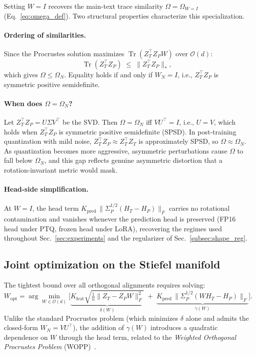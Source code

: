 Setting $W = I$ recovers the main-text trace similarity $\Omega = \Omega_{W=I}$ (Eq.~\ref{eq:omega_def}). Two structural properties characterize this specialization.

\paragraph{Ordering of similarities.}
Since the Procrustes solution maximizes $\operatorname{Tr}(Z_T^\top Z_P W)$ over $\mathcal{O}(d)$:
\begin{equation}
\operatorname{Tr}(Z_T^\top Z_P) \;\le\; \|Z_T^\top Z_P\|_*,
\end{equation}
which gives $\Omega \le \Omega_N$. Equality holds if and only if $W_N = I$, i.e., $Z_T^\top Z_P$ is symmetric positive semidefinite.

\paragraph{When does $\Omega = \Omega_N$?}
Let $Z_T^\top Z_P = U\Sigma V^\top$ be the SVD. Then $\Omega = \Omega_N$ iff $VU^\top = I$, i.e., $U = V$, which holds when $Z_T^\top Z_P$ is symmetric positive semidefinite (SPSD). In post-training quantization with mild noise, $Z_T^\top Z_P \approx Z_T^\top Z_T$ is approximately SPSD, so $\Omega \approx \Omega_N$. As quantization becomes more aggressive, asymmetric perturbations cause $\Omega$ to fall below $\Omega_N$, and this gap reflects genuine asymmetric distortion that a rotation-invariant metric would mask.

\paragraph{Head-side simplification.}
At $W = I$, the head term $K_{\mathrm{pred}}\,\|\Sigma_P^{1/2}(H_T - H_P)\|_F$ carries no rotational contamination and vanishes whenever the prediction head is preserved (FP16 head under PTQ, frozen head under LoRA), recovering the regimes used throughout Sec.~\ref{sec:experiments} and the regularizer of Sec.~\ref{subsec:shape_reg}.


\subsection{Joint optimization on the Stiefel manifold}
\label{app:joint_opt}

The tightest bound over all orthogonal alignments requires solving:
\begin{equation}
\label{eq:joint_obj}
W_{\mathrm{opt}} = \arg\min_{W \in \mathcal{O}(d)}
\Big[
\underbrace{K_{\mathrm{feat}} \sqrt{\tfrac{1}{n}\|Z_T - Z_P W\|_F^2}}_{\delta(W)}
\;+\;
\underbrace{K_{\mathrm{pred}}\,\|\Sigma_P^{1/2}(W H_T - H_P)\|_F}_{\gamma(W)}
\Big].
\end{equation}
Unlike the standard Procrustes problem (which minimizes $\delta$ alone and admits the closed-form $W_N = VU^\top$), the addition of $\gamma(W)$ introduces a quadratic dependence on $W$ through the head term, related to the \emph{Weighted Orthogonal Procrustes Problem} (WOPP)~\citep{gower2004procrustes}.

